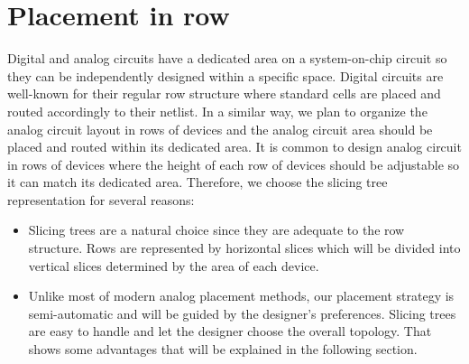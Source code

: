 \section{Placement in row}
Digital and analog circuits have a dedicated area on a system-on-chip circuit so they can be independently designed within a specific space. Digital circuits are well-known for their regular row structure where standard cells are placed and routed accordingly to their netlist. In a similar way, we plan to organize the analog circuit layout in rows of devices and the analog circuit area should be placed and routed within its dedicated area. 
\newline 
\newline 
\indent It is common to design analog circuit in rows of devices where the height of each row of devices should be adjustable so it can match its dedicated area. Therefore, we choose the slicing tree representation for several reasons:

\begin{itemize}
\item Slicing trees are a natural choice since they are adequate to the row structure. Rows are represented by horizontal slices which will be divided into vertical slices determined by the area of each device.

\item Unlike most of modern analog placement methods, our placement strategy is semi-automatic and will be guided by the designer's preferences. Slicing trees are easy to handle and let the designer choose the overall topology. That shows some advantages that will be explained in the following section.
\end{itemize}